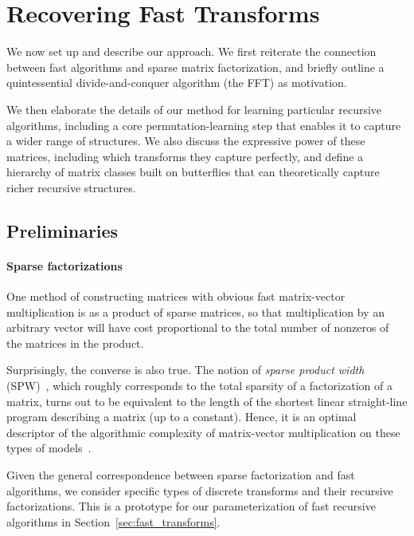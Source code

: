 \section{Recovering Fast Transforms}
\label{sec:method}

We now set up and describe our approach. We first reiterate the connection between fast algorithms and sparse matrix factorization, and briefly outline a quintessential divide-and-conquer algorithm (the FFT) as motivation.

We then elaborate the details of our method for learning particular recursive algorithms, including a core permutation-learning step that enables it to capture a wider range of structures. We also discuss the expressive power of these matrices, including which transforms they capture perfectly, and define a hierarchy of matrix classes built on butterflies that can theoretically capture richer recursive structures.

\subsection{Preliminaries}
\label{sec:preliminaries}

\paragraph{Sparse factorizations}

One method of constructing matrices with obvious fast matrix-vector multiplication is as a product of sparse matrices, so that multiplication by an arbitrary vector will have cost proportional to the total number of nonzeros of the matrices in the product.

Surprisingly, the converse is also true. The notion of \emph{sparse product width} (SPW)~\citep{desa2018two}, which roughly corresponds to the total sparsity of a factorization of a matrix, turns out to be equivalent to the length of the shortest linear straight-line program describing a matrix (up to a constant). Hence, it is an optimal descriptor of the algorithmic complexity of matrix-vector multiplication on these types of models~\cite{burgisser2013algebraic}.

\label{subsec:dft}

Given the general correspondence between sparse factorization and fast algorithms, we consider specific types of discrete transforms and their recursive factorizations. This is a prototype for our parameterization of fast recursive algorithms in
Section~\ref{sec:fast_transforms}.

